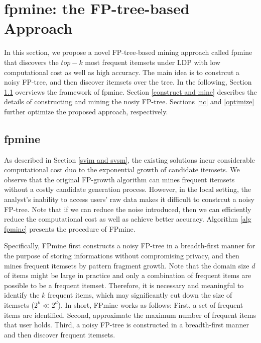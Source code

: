 \documentclass[conference]{IEEEtran}
\begin{document}
\section{fpmine: the FP-tree-based Approach}
In this section, we propose a novel FP-tree-based mining approach called fpmine that discovers the $top-k$ most frequent itemsets under LDP with low computational cost as well as high accuracy. The main idea is to constrcut a noisy FP-tree, and then discover itemsets over the tree. In the following, Section \ref{fpmine} overviews the framework of fpmine. Section \ref{construct and mine} describes the details of constructing and mining the nosiy FP-tree. Sections \ref{nc} and \ref{optimize} further optimize the proposed approach, respectively.

\subsection{fpmine}
\label{fpmine}
As described in Section \ref{svim and svsm}, the existing solutions incur considerable computational cost duo to the exponential growth of candidate itemsets. We observe that the original FP-growth algorithm can mines frequent itemsets without a costly candidate generation process. However, in the local setting, the analyst's inability to access users' raw data makes it difficult to constrcut a noisy FP-tree. Note that if we can reduce the noise introduced, then we can efficiently reduce the computational cost as well as achieve better accuracy. Algorithm \ref{alg fpmine} presents the procedure of FPmine.

Specifically, FPmine first constructs a noisy FP-tree in a breadth-first manner for the purpose of storing informations without compromising privacy, and then mines frequent itemsets by pattern fragment growth. Note that the domain size $d$ of items might be large in practice and only a combination of frequent items are possible to be a frequent itemset. Therefore, it is necessary and meaningful to identify the $k$ frequent items, which may significantly cut down the size of itemsets ($2^k \ll 2^d$). In short, FPmine works as follows: First, a set of frequent items are identified. Second, approximate the maximum number of frequent items that user holds. Third, a noisy FP-tree is constructed in a breadth-first manner and then discover frequent itemsets.
\end{document}
